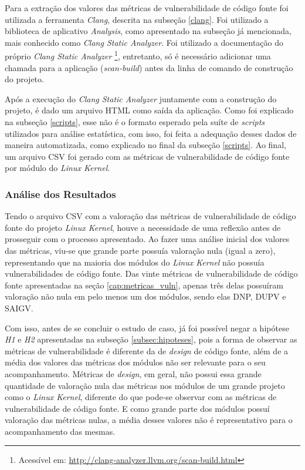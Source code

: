 Para a extração dos valores das métricas de vulnerabilidade de código fonte foi
utilizada a ferramenta \emph{Clang}, descrita na subseção
\ref{clang}. Foi utilizado a biblioteca de aplicativo
\textit{Analysis}, como apresentado na subseção já mencionada, mais conhecido como \emph{Clang Static
Analyzer}. Foi utilizado a documentação do próprio \emph{Clang Static Analyzer}
\footnote{Acessível em: \url{http://clang-analyzer.llvm.org/scan-build.html}},
entretanto, só é necessário adicionar uma chamada para a aplicação
(\textit{scan-build}) antes da linha de comando de construção do projeto.

Após a execução do \emph{Clang Static Analyzer} juntamente com a construção do
projeto, é dado um arquivo HTML como saída da aplicação. Como foi explicado na
subseção \ref{scripts}, esse não é o formato esperado pela suíte de
\textit{scripts} utilizados para análise estatística, com isso, foi feita a
adequação desses dados de maneira automatizada, como explicado no final da
subseção \ref{scripts}. Ao final, um arquivo CSV foi gerado com as métricas de
vulnerabilidade de código fonte por módulo do \emph{Linux Kernel}.

\subsubsection{Análise dos Resultados}

Tendo o arquivo CSV com a valoração das métricas de vulnerabilidade de código
fonte do projeto \emph{Linux Kernel}, houve a necessidade de uma reflexão antes
de prosseguir com o processo apresentado. Ao
fazer uma análise inicial dos valores das métricas, viu-se que grande parte
possuía valoração nula (igual a zero), representando que na maioria dos módulos
do \emph{Linux Kernel} não possuía vulnerabilidades de código fonte. Das vinte
métricas de vulnerabilidade de código fonte apresentadas na seção
\ref{cap:metricas_vuln}, apenas três delas possuíram valoração não nula em pelo
menos um dos módulos, sendo elas DNP, DUPV e SAIGV. 

Com isso, antes de se concluir o estudo de caso, já foi
possível negar a hipótese \emph{H1} e \emph{H2} apresentadas na subseção
\ref{subsec:hipoteses}, pois a forma de observar as métricas de vulnerabilidade
é diferente da de \textit{design} de código fonte, além de a média dos valores
das métricas dos módulos não ser relevante para o seu acompanhamento. Métricas de \textit{design},
em geral, não possui essa grande quantidade de valoração nula das métricas nos
módulos de um grande projeto como o \emph{Linux Kernel}, diferente do que
pode-se observar com as métricas de vulnerabilidade de código fonte. E como
grande parte dos módulos possuí valoração das métricas nulas, a média desses
valores não é representativo para o acompanhamento das mesmas.

